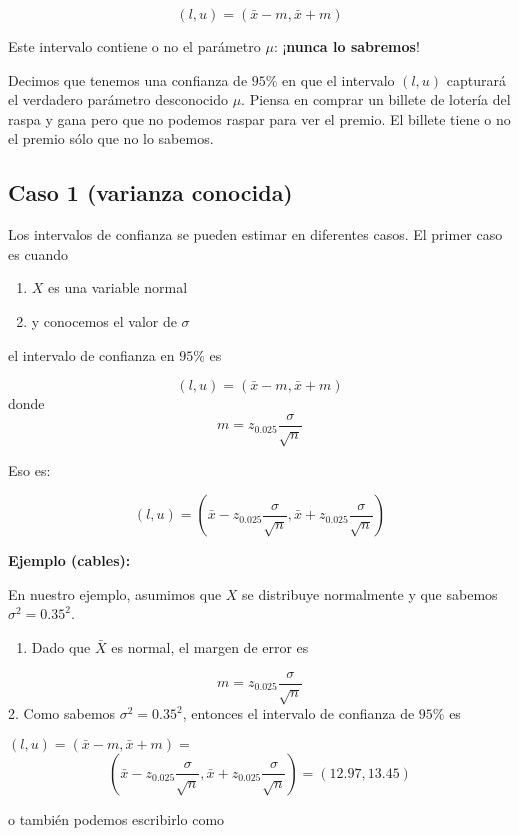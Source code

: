 \documentclass[
]{book}
\providecommand{\tightlist}{%
  \setlength{\itemsep}{0pt}\setlength{\parskip}{0pt}}
\begin{document}
\[(l,u)=(\bar{x} - m,\bar{x} + m)\]

Este intervalo contiene o no el parámetro \(\mu\): ¡\textbf{nunca lo sabremos}!

Decimos que tenemos una confianza de \(95\%\) en que el intervalo \((l,u)\) capturará el verdadero parámetro desconocido \(\mu\). Piensa en comprar un billete de lotería del raspa y gana pero que no podemos raspar para ver el premio. El billete tiene o no el premio sólo que no lo sabemos.

\hypertarget{caso-1-varianza-conocida}{%
\subsection{Caso 1 (varianza conocida)}\label{caso-1-varianza-conocida}}

Los intervalos de confianza se pueden estimar en diferentes casos. El primer caso es cuando

\begin{enumerate}
\def\labelenumi{\arabic{enumi}.}
\tightlist
\item
  \(X\) es una variable normal
\item
  y conocemos el valor de \(\sigma\)
\end{enumerate}

el intervalo de confianza en \(95\%\) es

\[(l,u)=(\bar{x} - m, \bar{x} + m)\]
donde \[m=z_{0.025} \frac{\sigma}{\sqrt{n}}\]

Eso es:

\[(l,u)=(\bar{x} - z_{0.025} \frac{\sigma}{\sqrt{n}}, \bar{x} + z_{0.025} \frac{\sigma}{ \sqrt{n}})\]

\textbf{Ejemplo (cables):}

En nuestro ejemplo, asumimos que \(X\) se distribuye normalmente y que sabemos \(\sigma^2=0.35^2\).

\begin{enumerate}
\def\labelenumi{\arabic{enumi}.}
\tightlist
\item
  Dado que \(\bar{X}\) es normal, el margen de error es
\end{enumerate}

\[m=z_{0.025} \frac{\sigma}{\sqrt{n}}\]
2. Como sabemos \(\sigma^2=0.35^2\), entonces el intervalo de confianza de \(95\%\) es

\((l,u)=(\bar{x} - m, \bar{x} + m)=\) \[(\bar{x}-z_{0.025} \frac{\sigma}{\sqrt{n }}, \bar{x}+z_{0.025} \frac{\sigma}{\sqrt{n}})= (12.97,13.45)\]

o también podemos escribirlo como
\end{document}
